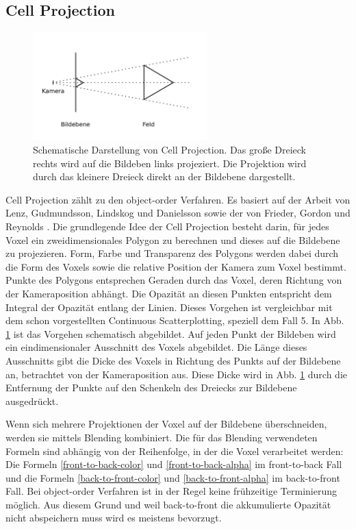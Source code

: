 \documentclass[a4paper,fontsize=12pt,toc=bib,halfparskip]{scrartcl}
\begin{document}
\subsection{Cell Projection}
\begin{figure}
	\centering
	\includegraphics[width=0.6\textwidth]{pictures/CellProjection}
	\caption{Schematische Darstellung von Cell Projection. Das gro{\ss}e Dreieck rechts wird auf die Bildeben links projeziert. Die Projektion wird durch das kleinere Dreieck direkt an der Bildebene dargestellt.}
	\label{CellProjection}
\end{figure}
Cell Projection z\"ahlt zu den object-order Verfahren. Es basiert auf der Arbeit von Lenz, Gudmundsson, Lindskog und Danielsson \cite{lenz86display} sowie der von Frieder, Gordon und Reynolds \cite{frieder1985back}. Die grundlegende Idee der Cell Projection besteht darin, f\"ur jedes Voxel ein zweidimensionales Polygon zu berechnen und dieses auf die Bildebene zu projezieren. Form, Farbe und Transparenz des Polygons werden dabei durch die Form des Voxels sowie die relative Position der Kamera zum Voxel bestimmt. Punkte des Polygons entsprechen Geraden durch das Voxel, deren Richtung von der Kameraposition abh\"angt. Die Opazit\"at an diesen Punkten entspricht dem Integral der Opazit\"at entlang der Linien. Dieses Vorgehen ist vergleichbar mit dem schon vorgestellten Continuous Scatterplotting, speziell dem Fall 5. In Abb. \ref{CellProjection} ist das Vorgehen schematisch abgebildet. Auf jeden Punkt der Bildeben wird ein eindimensionaler Ausschnitt des Voxels abgebildet. Die L\"ange dieses Ausschnitts gibt die Dicke des Voxels in Richtung des Punkts auf der Bildebene an, betrachtet von der Kameraposition aus. Diese Dicke wird in Abb. \ref{CellProjection} durch die Entfernung der Punkte auf den Schenkeln des Dreiecks zur Bildebene ausgedr\"uckt.

Wenn sich mehrere Projektionen der Voxel auf der Bildebene \"uberschneiden, werden sie mittels Blending kombiniert. Die f\"ur das Blending verwendeten Formeln sind abh\"angig von der Reihenfolge, in der die Voxel verarbeitet werden: Die Formeln \ref{front-to-back-color} und \ref{front-to-back-alpha} im front-to-back Fall und die Formeln \ref{back-to-front-color} und \ref{back-to-front-alpha} im back-to-front Fall. Bei object-order Verfahren ist in der Regel keine fr\"uhzeitige Terminierung m\"oglich. Aus diesem Grund und weil back-to-front die akkumulierte Opazit\"at nicht abspeichern muss wird es meistens bevorzugt.
\end{document}
